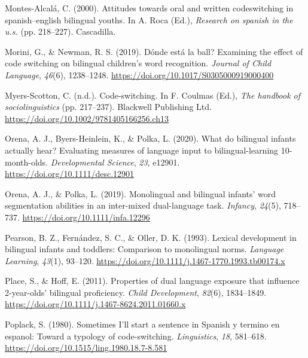 \documentclass[
  man,floatsintext]{apa7}
\newlength{\cslhangindent}
\newlength{\cslentryspacingunit} %
\newenvironment{CSLReferences}[2] %
 {%
  \setlength{\parindent}{0pt}
  \ifodd #1
  \let\oldpar\par
  \def\par{\hangindent=\cslhangindent\oldpar}
  \fi
  \setlength{\parskip}{#2\cslentryspacingunit}
 }%
 {}
\begin{document}
\begin{CSLReferences}{1}{0}
\leavevmode{}%
Montes-Alcalá, C. (2000). Attitudes towards oral and written codeswitching in spanish--english bilingual youths. In A. Roca (Ed.), \emph{Research on spanish in the u.s.} (pp. 218--227). Cascadilla.

\leavevmode{}%
Morini, G., \& Newman, R. S. (2019). Dónde está la ball? Examining the effect of code switching on bilingual children's word recognition. \emph{Journal of Child Language}, \emph{46}(6), 1238--1248. \url{https://doi.org/10.1017/S0305000919000400}

\leavevmode{}%
Myers-Scotton, C. (n.d.). Code-switching. In F. Coulmas (Ed.), \emph{The handbook of sociolinguistics} (pp. 217--237). Blackwell Publishing Ltd. \url{https://doi.org/10.1002/9781405166256.ch13}

\leavevmode{}%
Orena, A. J., Byers-Heinlein, K., \& Polka, L. (2020). What do bilingual infants actually hear? Evaluating measures of language input to bilingual-learning 10-month-olds. \emph{Developmental Science}, \emph{23}, e12901. \url{https://doi.org/10.1111/desc.12901}

\leavevmode{}%
Orena, A. J., \& Polka, L. (2019). Monolingual and bilingual infants' word segmentation abilities in an inter-mixed dual-language task. \emph{Infancy}, \emph{24}(5), 718--737. \url{https://doi.org/10.1111/infa.12296}

\leavevmode{}%
Pearson, B. Z., Fernández, S. C., \& Oller, D. K. (1993). Lexical development in bilingual infants and toddlers: Comparison to monolingual norms. \emph{Language Learning}, \emph{43}(1), 93--120. \url{https://doi.org/10.1111/j.1467-1770.1993.tb00174.x}

\leavevmode{}%
Place, S., \& Hoff, E. (2011). Properties of dual language exposure that influence 2-year-olds' bilingual proficiency. \emph{Child Development}, \emph{82}(6), 1834--1849. \url{https://doi.org/10.1111/j.1467-8624.2011.01660.x}

\leavevmode{}%
Poplack, S. (1980). Sometimes {I'll} start a sentence in {Spanish} y termino en espanol: Toward a typology of code-switching. \emph{Linguistics}, \emph{18}, 581--618. \url{https://doi.org/10.1515/ling.1980.18.7-8.581}


\end{CSLReferences}
\end{document}
